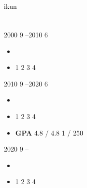 \documentclass{article}
\begin{document}
    \begin{minipage}[t]{0.78\textwidth}
        \begin{minipage}[t]{\textwidth}
        \section[ ]{\makebox[\iconwidth][c]{\color{primary_color}{\faAddressCard}}\quad  }
        \begin{minipage}[t]{0.5\textwidth}
            \textbf{ \qquad  } ikun
            
            \vspace{0.5em}
            \textbf{ } 
        \end{minipage}
        \begin{minipage}[t]{0.35\textwidth}
            \textbf{ \qquad  } 
            
            \vspace{0.5em}
            \textbf{ } 
        \end{minipage}
        \vspace{1.2em}
        \end{minipage}

        \begin{minipage}[t]{\textwidth}
        \section[ ]{\makebox[\iconwidth][c]{\color{primary_color}{\faGraduationCap}}\quad  }
        
        {\large \textbf{ }}  \hfill 2000 9 --2010 6 
        \begin{itemize}
            \item  
            \item \textbf{ } 1 2 3 4\  
        \end{itemize}
        
        \vspace{0.5em}
        {\large \textbf{ }}  \hfill 2010 9 --2020 6 
        \begin{itemize}
            \item  
            \item \textbf{ } 1 2 3 4\  
            \item \textbf{GPA} 4.8 / 4.8 1 / 250 
        \end{itemize}
        
        \vspace{0.5em}
        {\large \textbf{ }}  \hfill 2020 9 -- 
        \begin{itemize}
            \item  \  
            \item \textbf{ } 1 2 3 4\  
        \end{itemize}
        
        \vspace{1.2em}
        \end{minipage}
    \end{minipage}
\end{document}
